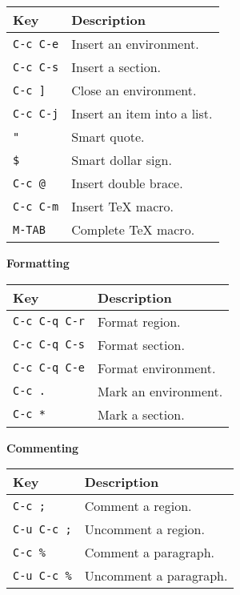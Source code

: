 \documentclass{article}
\begin{document}
\smallskip

\noindent
\begin{tabular}{p{\firstcol}p{\secondcol}}
\hline
\textbf{Key} & \textbf{Description}\\
\hline
\texttt{C-c C-e}
& Insert an environment.\\
\texttt{C-c C-s}
& Insert a section.\\
\texttt{C-c ]}
& Close an environment.\\
\texttt{C-c C-j}
& Insert an item into a list.\\
\texttt{"}
& Smart quote.\\
\texttt{\$}
& Smart dollar sign.\\
\texttt{C-c @}
& Insert double brace.\\
\texttt{C-c C-m}
& Insert \TeX{} macro.\\
\texttt{M-TAB}
& Complete \TeX{} macro.\\
\end{tabular}

\smallskip

\noindent
\textbf{Formatting}

\smallskip

\noindent
\begin{tabular}{p{\firstcol}p{\secondcol}}
\hline
\textbf{Key} & \textbf{Description}\\
\hline
\texttt{C-c C-q C-r}
& Format region.\\
\texttt{C-c C-q C-s}
& Format section.\\
\texttt{C-c C-q C-e}
& Format environment.\\
\texttt{C-c .}
& Mark an environment.\\
\texttt{C-c *}
& Mark a section.
\end{tabular}

\newpage

\noindent
\textbf{Commenting}

\smallskip

\noindent
\begin{tabular}{p{\firstcol}p{\secondcol}}
\hline
\textbf{Key} & \textbf{Description}\\
\hline
\texttt{C-c ;}
& Comment a region.\\
\texttt{C-u C-c ;}
& Uncomment a region.\\
\texttt{C-c \%}
& Comment a paragraph.\\
\texttt{C-u C-c \%}
& Uncomment a paragraph.
\end{tabular}
\end{document}
